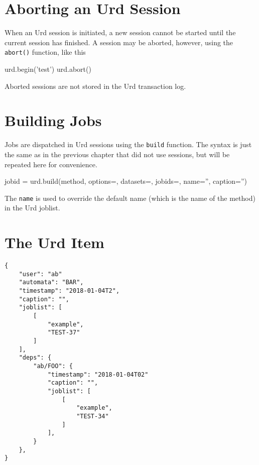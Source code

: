 \section{Aborting an Urd Session}

When an Urd session is initiated, a new session cannot be started
until the current session has finished.  A session may be aborted,
however, using the \texttt{abort()} function, like this
\begin{python}
urd.begin('test')
urd.abort()
\end{python}
Aborted sessions are not stored in the Urd transaction log.




\section{Building Jobs}

Jobs are dispatched in Urd sessions using the \texttt{build} function.
The syntax is just the same as in the previous chapter that did not
use sessions, but will be repeated here for convenience.\\[-3ex]
\begin{python}
jobid = urd.build(method, options={}, datasets={}, jobids={}, name='', caption='')
\end{python}
The \texttt{name} is used to override the default name (which is the name of the method) in the Urd joblist.



\section{The Urd Item}

\begin{leftbar}
\begin{verbatim}
{
    "user": "ab"
    "automata": "BAR",
    "timestamp": "2018-01-04T2",
    "caption": "",
    "joblist": [
        [
            "example",
            "TEST-37"
        ]
    ],
    "deps": {
        "ab/FOO": {
            "timestamp": "2018-01-04T02"
            "caption": "",
            "joblist": [
                [
                    "example",
                    "TEST-34"
                ]
            ],
        }
    },
}
\end{verbatim}
\end{leftbar}

